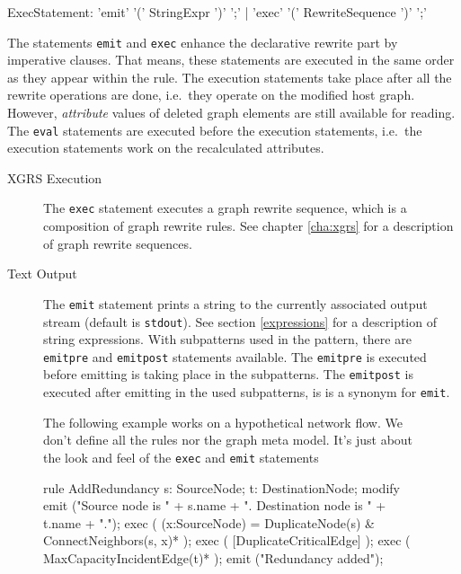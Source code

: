 \begin{rail}  
  ExecStatement: 'emit' '(' StringExpr ')' ';' |
    'exec' '(' RewriteSequence ')' ';'
\end{rail}
The statements \texttt{emit} and \texttt{exec} enhance the declarative rewrite part by imperative clauses.
That means, these statements are executed in the same order as they appear within the rule.
The execution statements take place after all the rewrite operations are done, i.e.\ they operate on the modified host graph.
However, \emph{attribute} values of deleted graph elements are still available for reading.
The \texttt{eval} statements are executed before the execution statements, i.e.\ the execution statements work on the recalculated attributes.
\begin{description}
  \item[XGRS Execution] The \texttt{exec} statement executes a graph rewrite sequence, which is a composition of graph rewrite rules. See chapter \ref{cha:xgrs} for a description of graph rewrite sequences.
  \item[Text Output] The \texttt{emit} statement prints a string to the currently associated output stream (default is \texttt{stdout}). See section \ref{expressions} for a description of string expressions.
  With subpatterns used in the pattern, there are \texttt{emitpre} and \texttt{emitpost} statements available.
  The \texttt{emitpre} is executed before emitting is taking place in the subpatterns. 
  The \texttt{emitpost} is executed after emitting in the used subpatterns, is is a synonym for \texttt{emit}. 
\end{description}

\begin{figure}[htbp]
\begin{example}
	The following example works on a hypothetical network flow.
	We don't define all the rules nor the graph meta model.
	It's just about the look and feel of the \texttt{exec} and \texttt{emit} statements
	\begin{grgen}
rule AddRedundancy {
  s: SourceNode;
  t: DestinationNode;	
  modify {
    emit ("Source node is " + s.name + ". Destination node is " + t.name + ".");
    exec ( (x:SourceNode) = DuplicateNode(s) & ConnectNeighbors(s, x)* );
    exec ( [DuplicateCriticalEdge] );
    exec ( MaxCapacityIncidentEdge(t)* );
    emit ("Redundancy added");
  }
}  
	\end{grgen}
\end{example}
\end{figure}
